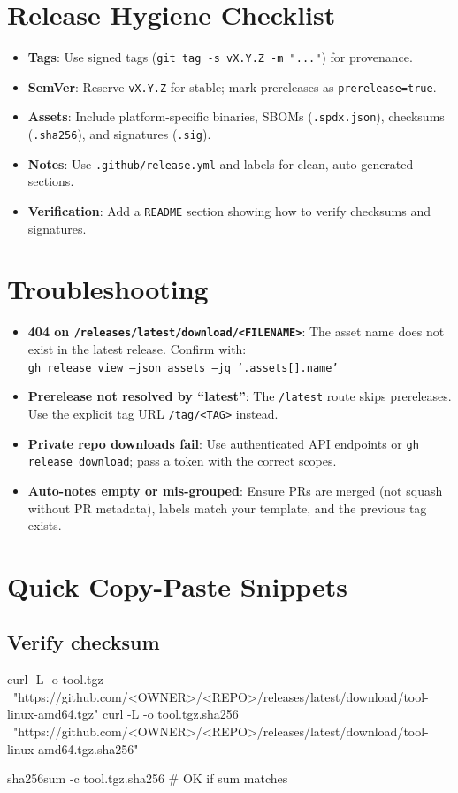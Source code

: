 \documentclass[11pt]{article}
\newcommand{\key}[1]{\texttt{#1}}
\newcommand{\file}[1]{\texttt{#1}}
\begin{document}
\section{Release Hygiene Checklist}
\begin{itemize}
  \item \textbf{Tags}: Use signed tags (\file{git tag -s vX.Y.Z -m "..."}) for provenance.
  \item \textbf{SemVer}: Reserve \file{vX.Y.Z} for stable; mark prereleases as \key{prerelease=true}.
  \item \textbf{Assets}: Include platform-specific binaries, SBOMs (\file{.spdx.json}), checksums (\file{.sha256}), and signatures (\file{.sig}).
  \item \textbf{Notes}: Use \file{.github/release.yml} and labels for clean, auto-generated sections.
  \item \textbf{Verification}: Add a \file{README} section showing how to verify checksums and signatures.
\end{itemize}

\section{Troubleshooting}
\begin{itemize}
  \item \textbf{404 on \file{/releases/latest/download/<FILENAME>}}: The asset name does not exist in the latest release. Confirm with: \\
  \file{gh release view --json assets --jq '.assets[].name'}
  \item \textbf{Prerelease not resolved by ``latest''}: The \file{/latest} route skips prereleases. Use the explicit tag URL \file{/tag/<TAG>} instead.
  \item \textbf{Private repo downloads fail}: Use authenticated API endpoints or \file{gh release download}; pass a token with the correct scopes.
  \item \textbf{Auto-notes empty or mis-grouped}: Ensure PRs are merged (not squash without PR metadata), labels match your template, and the previous tag exists.
\end{itemize}

\section{Quick Copy-Paste Snippets}
\subsection*{Verify checksum}
\begin{bashcode}
curl -L -o tool.tgz \
  "https://github.com/<OWNER>/<REPO>/releases/latest/download/tool-linux-amd64.tgz"
curl -L -o tool.tgz.sha256 \
  "https://github.com/<OWNER>/<REPO>/releases/latest/download/tool-linux-amd64.tgz.sha256"

sha256sum -c tool.tgz.sha256   # OK if sum matches
\end{bashcode}
\end{document}
